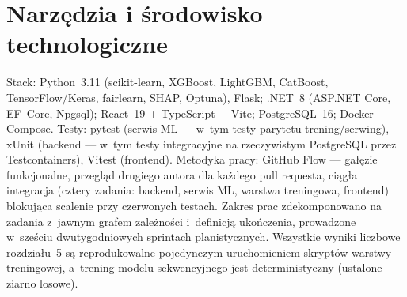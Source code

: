 \section{Narzędzia i środowisko technologiczne}

Stack: Python~3.11 (scikit-learn, XGBoost, LightGBM, CatBoost,
TensorFlow/Keras, fairlearn, SHAP, Optuna), Flask; .NET~8 (ASP.NET Core,
EF~Core, Npgsql); React~19 + TypeScript + Vite; PostgreSQL~16; Docker Compose.
Testy: pytest (serwis ML --- w~tym testy parytetu trening/serwing), xUnit
(backend --- w~tym testy integracyjne na rzeczywistym PostgreSQL przez
Testcontainers), Vitest (frontend). Metodyka pracy: GitHub Flow --- gałęzie
funkcjonalne, przegląd drugiego autora dla każdego pull requesta, ciągła
integracja (cztery zadania: backend, serwis ML, warstwa treningowa, frontend)
blokująca scalenie przy czerwonych testach. Zakres prac zdekomponowano na
zadania z~jawnym grafem zależności i~definicją ukończenia, prowadzone
w~sześciu dwutygodniowych sprintach planistycznych. Wszystkie wyniki liczbowe
rozdziału~5 są reprodukowalne pojedynczym uruchomieniem skryptów warstwy
treningowej, a~trening modelu sekwencyjnego jest deterministyczny (ustalone
ziarno losowe).
